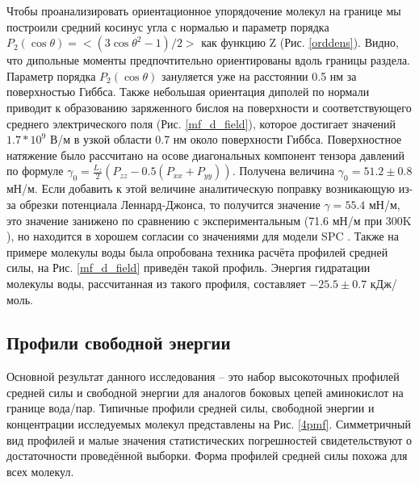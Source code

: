 Чтобы проанализировать ориентационное упорядочение молекул на границе мы построили
средний косинус угла с нормалью и параметр порядка $P_2(\cos{\theta})=<(3\cos{\theta}^2-1)/2>$ как функцию Z (Рис. \ref{orddens}). Видно, что дипольные моменты предпочтительно
ориентированы вдоль границы раздела. Параметр порядка $P_2(\cos{\theta})$  зануляется уже на расстоянии 0.5 нм за поверхностью Гиббса. Также небольшая ориентация диполей по нормали приводит к образованию заряженного бислоя на поверхности и соответствующего среднего электрического поля (Рис. \ref{mf_d_field}), которое достигает значений $1.7*10^{9}$ В/м в узкой области 0.7 нм около поверхности Гиббса.
Поверхностное натяжение было рассчитано на осове диагональных компонент тензора давлений по формуле $\gamma_0=\frac{L_z}{2}(P_{zz}-0.5(P_{xx}+P_{yy}))$. Получена величина $\gamma_0=51.2\pm0.8$ мН/м. Если добавить к этой величине аналитическую поправку возникающую из-за обрезки потенциала Леннард-Джонса, то получится значение 
$\gamma=55.4$ мН/м, это значение занижено по сравнению с экспериментальным (71.6 мН/м при 300K \cite{chem_handbook} ), но находится в хорошем согласии со значениями для модели SPC \cite{smith_surften}. 
 Также на примере молекулы воды была опробована техника расчёта профилей средней силы, на Рис. \ref{mf_d_field} приведён такой профиль. Энергия гидратации молекулы воды, рассчитанная из такого профиля, составляет $-25.5\pm0.7$ кДж/моль.


\subsection{\label{sec:fep_res}Профили свободной энергии}
Основной результат данного исследования -- это набор высокоточных профилей средней силы и свободной энергии для аналогов боковых цепей аминокислот на границе вода/пар. 
Типичные профили средней силы, свободной энергии и концентрации исследуемых молекул представлены на Рис. \ref{4pmf}. Симметричный вид профилей и малые значения статистических погрешностей свидетельствуют о достаточности проведённой выборки. Форма профилей средней силы похожа для всех молекул.

